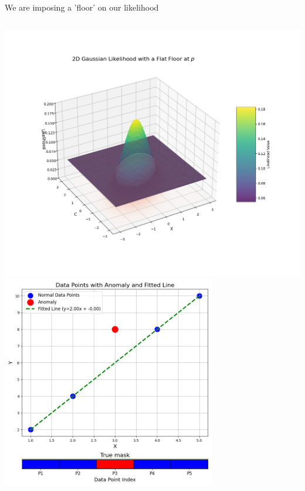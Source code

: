 \documentclass[aspectratio=169]{beamer}
\begin{document}
\begin{frame}{We are imposing a 'floor' on our likelihood}
    \begin{columns}
            \centering
            \includegraphics[width=1.2\textwidth]{images/likelihood_floor_plot.png}
            \centering
            \includegraphics[width=0.7\textwidth]{images/generated_plot.png}
    \end{columns}
\end{frame}
\end{document}
